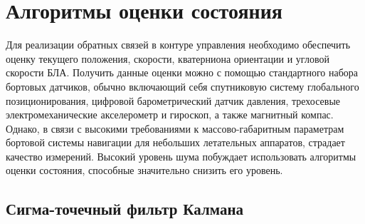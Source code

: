 
\chapter{Алгоритмы оценки состояния}
\label{chapter_estimation}

Для реализации обратных связей в контуре управления необходимо обеспечить оценку текущего положения, скорости, кватерниона ориентации и угловой скорости БЛА. Получить данные оценки можно с помощью стандартного набора бортовых датчиков, обычно включающий себя спутниковую систему глобального позиционирования, цифровой барометрический датчик давления, трехосевые электромеханические акселерометр и гироскоп, а также магнитный компас. Однако, в связи с высокими требованиями к массово-габаритным параметрам бортовой системы навигации для небольших летательных аппаратов, страдает качество измерений. Высокий уровень шума побуждает использовать алгоритмы оценки состояния, способные значительно снизить его уровень.

\section{Сигма-точечный фильтр Калмана}

